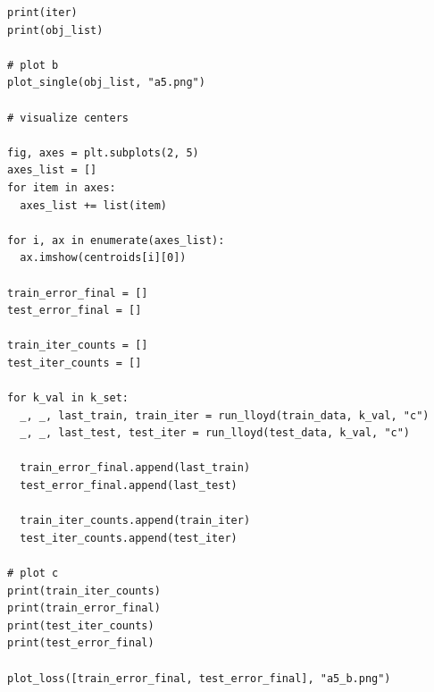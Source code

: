 \documentclass{article}
\newcommand{\1}{\mathbf{1}}
\begin{document}
{\begin{verbatim}
print(iter)
print(obj_list)

# plot b
plot_single(obj_list, "a5.png")

# visualize centers

fig, axes = plt.subplots(2, 5)
axes_list = []
for item in axes:
  axes_list += list(item)

for i, ax in enumerate(axes_list):
  ax.imshow(centroids[i][0])

train_error_final = []
test_error_final = []

train_iter_counts = []
test_iter_counts = []

for k_val in k_set:
  _, _, last_train, train_iter = run_lloyd(train_data, k_val, "c")
  _, _, last_test, test_iter = run_lloyd(test_data, k_val, "c")

  train_error_final.append(last_train)
  test_error_final.append(last_test)

  train_iter_counts.append(train_iter)
  test_iter_counts.append(test_iter)

# plot c
print(train_iter_counts)
print(train_error_final)
print(test_iter_counts)
print(test_error_final)

plot_loss([train_error_final, test_error_final], "a5_b.png")
\end{verbatim}

\newpage

}
\end{document}
